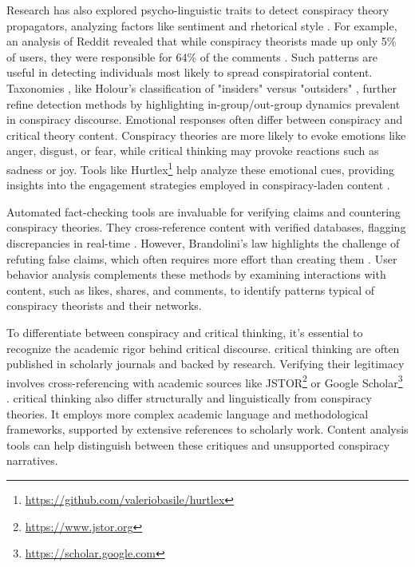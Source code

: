 \documentclass{Configuration_Files/PoliMi3i_thesis}
\begin{document}
Research has also explored psycho-linguistic traits to detect conspiracy theory propagators, analyzing factors like sentiment and rhetorical style \cite{giachanou2023detection}. For example, an analysis of Reddit revealed that while conspiracy theorists made up only 5\% of users, they were responsible for 64\% of the comments \cite{unesco2020}. Such patterns are useful in detecting individuals most likely to spread conspiratorial content. Taxonomies \cite{korenvcic2024distinguishes}, like Holour's classification of "insiders" versus "outsiders" \cite{holur2022insider}, further refine detection methods by highlighting in-group/out-group dynamics prevalent in conspiracy discourse. Emotional responses often differ between conspiracy and critical theory content. Conspiracy theories are more likely to evoke emotions like anger, disgust, or fear, while critical thinking may provoke reactions such as sadness or joy. Tools like Hurtlex\footnote{\url{https://github.com/valeriobasile/hurtlex}} help analyze these emotional cues, providing insights into the engagement strategies employed in conspiracy-laden content \cite{bassignana2018hurtlex}.

Automated fact-checking tools are invaluable for verifying claims and countering conspiracy theories. They cross-reference content with verified databases, flagging discrepancies in real-time \cite{graves2016deciding}. However, Brandolini’s law highlights the challenge of refuting false claims, which often requires more effort than creating them \cite{brandolini2013}. User behavior analysis complements these methods by examining interactions with content, such as likes, shares, and comments, to identify patterns typical of conspiracy theorists and their networks.

To differentiate between conspiracy and critical thinking, it's essential to recognize the academic rigor behind critical discourse. critical thinking are often published in scholarly journals and backed by research. Verifying their legitimacy involves cross-referencing with academic sources like JSTOR\footnote{\url{https://www.jstor.org}} or Google Scholar\footnote{\url{https://scholar.google.com}} \cite{souder2011ethics}. critical thinking also differ structurally and linguistically from conspiracy theories. It employs more complex academic language and methodological frameworks, supported by extensive references to scholarly work. Content analysis tools can help distinguish between these critiques and unsupported conspiracy narratives.

\end{document}
